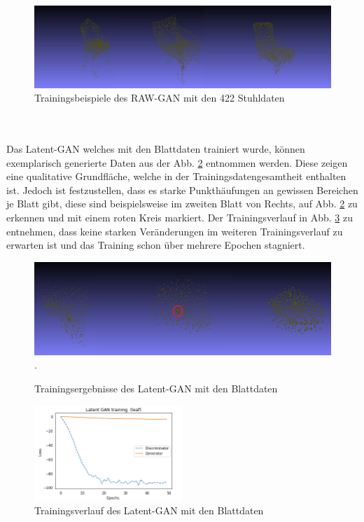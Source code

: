 \documentclass{llncs}
\begin{document}
\begin{figure}[htbp] 
	\centering
	\includegraphics[width=1.0\textwidth]{latent_gan_chair_example.png}
	\caption{Trainingsbeispiele des RAW-GAN mit den 422 Stuhldaten}
	\label{fig:Bild62}
\end{figure}
~\\\\
Das Latent-GAN welches mit den Blattdaten trainiert wurde, können exemplarisch generierte Daten aus der Abb. \ref{fig:Bild64} entnommen werden. Diese zeigen eine qualitative Grundfläche, welche in der Trainingsdatengesamtheit enthalten ist. Jedoch ist festzustellen, dass es starke Punkthäufungen an gewissen Bereichen je Blatt gibt, diese sind beispielsweise im zweiten Blatt von Rechts, auf Abb. \ref{fig:Bild64} zu erkennen und mit einem roten Kreis markiert. Der Trainingsverlauf in Abb. \ref{fig:Bild63} zu entnehmen, dass keine starken Veränderungen im weiteren Trainingsverlauf zu erwarten ist und das Training schon über mehrere Epochen stagniert.
\begin{figure}[htbp] 
	\centering
	\includegraphics[width=1.0\textwidth]{latent_gan_leaf_example.png}.
	\caption{Trainingsergebnisse des Latent-GAN mit den Blattdaten}
	\label{fig:Bild64}
\end{figure}
\begin{figure}[htbp] 
	\centering
	\includegraphics[width=0.5\textwidth]{Latent_gan_training_result.png}
	\caption{Trainingsverlauf des Latent-GAN mit den Blattdaten}
	\label{fig:Bild63}
\end{figure}
\end{document}
